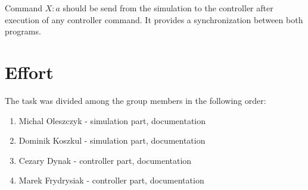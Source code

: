 \documentclass[12pt]{article}
\begin{document}
Command $X:a$ should be send from the simulation to the controller after execution of any controller command. It provides a synchronization between both programs.

\section{Effort}
The task was divided among the group members in the following order:
\begin{enumerate}
\item Michal Oleszczyk - simulation part, documentation
\item Dominik Koszkul - simulation part, documentation
\item Cezary Dynak - controller part, documentation
\item Marek Frydrysiak - controller part, documentation
\end{enumerate}
\end{document}
